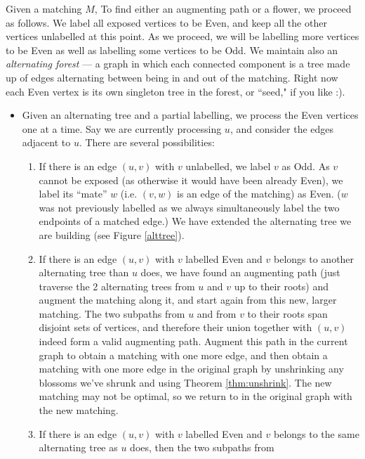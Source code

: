 \documentclass[12pt]{article}
\begin{document}
\noindent {} Given a matching $M$, To find either an augmenting path or a flower, we proceed as
follows. We label all exposed vertices to be {\sc Even}, and keep all the
other vertices unlabelled at this point. As we proceed, we will be
labelling more vertices to be {\sc Even} as well as labelling some
vertices to be {\sc Odd}. We maintain also an {\it alternating forest} ---
a graph in which each connected component is a tree made up of edges
alternating between being in and out of the matching. Right now each {\sc Even} vertex is its own singleton tree in the forest, or ``seed," if you like :).
 \begin{itemize}

\item{}
Given an alternating tree and a partial labelling, we process the
{\sc Even} vertices one at a time. Say we are currently processing $u$,
and consider the edges adjacent to $u$. There are several
possibilities:
\begin{enumerate}
\item
If there is an edge $(u,v)$ with $v$ unlabelled, we label $v$
as {\sc Odd}. As $v$ cannot be exposed (as otherwise it would have been
already {\sc Even}), we label its ``mate'' $w$ (i.e. $(v,w)$ is an edge of
the matching) as {\sc Even}. ($w$ was not previously labelled as we always
simultaneously label the two endpoints of a matched edge.) 
We have extended the alternating tree we are
building (see Figure \ref{alttree}).
\item
If there is an edge $(u,v)$ with $v$ labelled {\sc Even} and $v$ belongs
to another alternating tree than $u$ does, we have found an
augmenting path (just traverse the 2 alternating trees from $u$ and
$v$ up to their roots) and augment the matching along it, and start again
from this new, larger matching. The two subpaths from $u$ and from $v$
to their roots span disjoint sets of vertices, and therefore their
union together with $(u,v)$ indeed form a valid augmenting path. Augment this path in the current graph to obtain a matching with one more edge, and then obtain a matching with one more edge in the original graph by unshrinking any blossoms we've shrunk and using Theorem \ref{thm:unshrink}. The new matching may not be optimal, so we return to  in the original graph with the new matching. 
\item
If there is an edge $(u,v)$ with $v$ labelled {\sc Even} and $v$ belongs
to the same alternating tree as $u$ does, then the two subpaths from

\end{enumerate}
\end{itemize}
\end{document}
